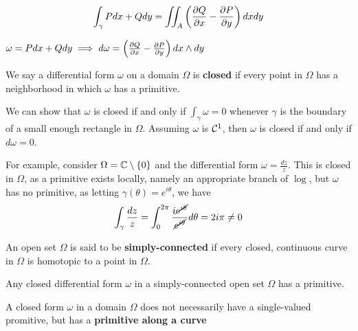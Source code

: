 \documentclass{article}
\begin{document}
\begin{theorem}
\begin{equation}\int_\gamma Pdx + Qdy = \iint_A\left({\frac{\partial {Q}}{\partial {x}}} - {\frac{\partial {P}}{\partial {y}}}\right)dxdy\end{equation}
\end{theorem}


\begin{definition}[TODO]
\(\omega = Pdx + Qdy \implies d\omega = \left({\frac{\partial {Q}}{\partial {x}}} - {\frac{\partial {P}}{\partial {y}}}\right)dx \wedge dy\)
\end{definition}


\begin{definition}
We say a differential form \(\omega\) on a domain \(\Omega\) is \textbf{closed} if every point in \(\Omega\) has a neighborhood in which \(\omega\) has a primitive.
\end{definition}

We can show that \(\omega\) is closed if and only if \(\int_\gamma\omega = 0\) whenever \(\gamma\) is the boundary of a small enough rectangle in \(\Omega\).
Assuming \(\omega\) is \(\mathcal{C}^1\), then \(\omega\) is closed if and only if \(d\omega = 0\).

For example, consider \(\Omega = \mathbb{C} \setminus \{0\}\) and the differential form \(\omega = \frac{dz}{z}\). This is closed in \(\Omega\), as a primitive exists locally, namely an appropriate branch of \(\log\), but \(\omega\) has no primitive, as letting \(\gamma(\theta) = e^{i\theta}\), we have
\begin{equation}
  \int_\gamma\frac{dz}{z} = \int_0^{2\pi}\frac{i\cancel{e^{i\theta}}}{\cancel{e^{i\theta}}}d\theta
  = 2i\pi \neq 0
\end{equation}

\begin{definition}
An open set \(\Omega\) is said to be \textbf{simply-connected} if every closed, continuous curve in \(\Omega\) is homotopic to a point in \(\Omega\).
\end{definition}

\begin{theorem}
Any closed differential form \(\omega\) in a simply-connected open set \(\Omega\) has a primitive.
\end{theorem}

A closed form \(\omega\) in a domain \(\Omega\) does not necessarily have a single-valued promitive, but has a \textbf{primitive along a curve}
\end{document}
